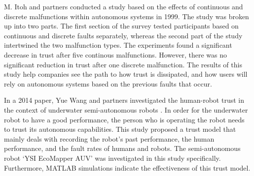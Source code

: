 \documentclass[runningheads,a4paper]{llncs}
\begin{document}
M. Itoh and partners conducted a study based on the effects of continuous and discrete malfunctions within autonomous systems in 1999\cite{itoh1999trust}.  The study was broken up into two parts.  The first section of the survey tested participants based on continuous and discrete faults separately, whereas the second part of the study intertwined the two malfunction types.  The experiments found a significant decrease in trust after five continous malfunctions.  However, there was no significant reduction in trust after one discrete malfunction.  The results of this study help companies see the path to how trust is dissipated, and how users will rely on autonomous systems based on the previous faults that occur.


In a 2014 paper, Yue Wang and partners investigated the human-robot trust in the context of underwater semi-autonomous robots \cite{wang2014human}. In order for the underwater robot to have a good performance, the person who is operating the robot needs to trust its autonomous capabilities. This study proposed a trust model that mainly deals with recording the robot's past performance, the human performance, and the fault rates of humans and robots. The semi-autonomous robot `YSI EcoMapper AUV' was investigated in this study specifically. Furthermore, MATLAB simulations indicate the effectiveness of this trust model.
\end{document}
